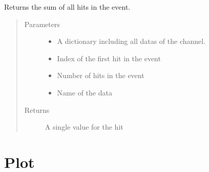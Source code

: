 \documentclass[letterpaper,10pt,english]{sphinxmanual}
\begin{document}
\begin{fulllineitems}
\label{\detokenize{autodocs/data:listmode.data.sum_combinator}}
\sphinxAtStartPar
Returns the sum of all hits in the event.
\begin{quote}\begin{description}
\item[{Parameters}] \leavevmode\begin{itemize}
\item {} 
\sphinxAtStartPar
{} \textendash{} A dictionary including all datas of the channel.

\item {} 
\sphinxAtStartPar
{} \textendash{} Index of the first hit in the event

\item {} 
\sphinxAtStartPar
{} \textendash{} Number of hits in the event

\item {} 
\sphinxAtStartPar
{} \textendash{} Name of the data

\end{itemize}

\item[{Returns}] \leavevmode
\sphinxAtStartPar
A single value for the hit

\end{description}\end{quote}

\end{fulllineitems}



\section{Plot}
\label{\detokenize{autodocs/plot:module-listmode.plot}}\label{\detokenize{autodocs/plot:plot}}\label{\detokenize{autodocs/plot::doc}}
\end{document}
